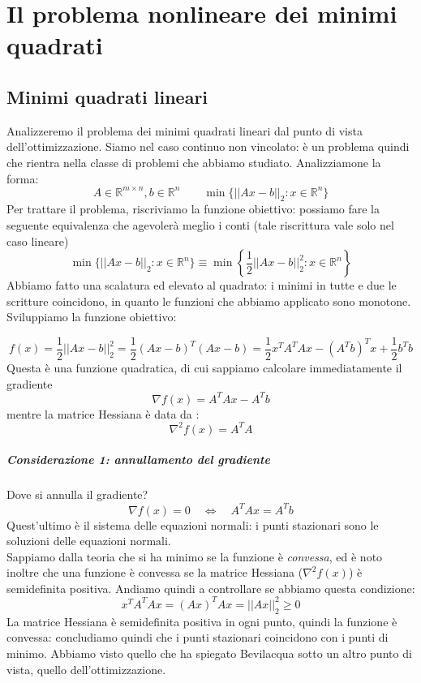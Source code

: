 


\inbpdocument 

\chapter{Il problema nonlineare dei minimi quadrati}
\section{Minimi quadrati lineari}
Analizzeremo il problema dei minimi quadrati lineari dal punto di vista
dell'ottimizzazione. Siamo nel caso continuo non vincolato:
è un problema quindi che rientra nella classe di problemi
che abbiamo studiato. Analizziamone la forma:
$$ A \in \mathbb{R}^{m \times n}, b \in \mathbb{R}^{n} \qquad
 \min \{ || Ax -b ||_{2} : x \in \mathbb{R}^{n} \} $$
Per trattare il problema, riscriviamo la funzione obiettivo:
possiamo fare la seguente equivalenza che  agevoler\`a
meglio i conti (tale riscrittura vale solo nel caso lineare)
$$ \min \{ || Ax -b ||_{2} : x \in \mathbb{R}^{n} \} 
 \equiv
 \min \left\{ \frac{1}{2} || Ax -b ||_{2}^{2} : x \in \mathbb{R}^{n} \right\}
 $$
Abbiamo fatto una scalatura ed elevato al quadrato:
i minimi in tutte e due le scritture coincidono, in quanto
le funzioni che abbiamo applicato sono monotone.
Sviluppiamo la funzione obiettivo:

$$ f(x) = \frac{1}{2} || Ax - b ||_{2}^{2} = \frac{1}{2}(Ax-b)^{T}(Ax-b) =
\frac{1}{2}x^{T} A^{T}A x - (A^{T}b)^{T}x + \frac{1}{2} b^{T}b $$
Questa \`e una  funzione quadratica, di cui sappiamo calcolare immediatamente
il gradiente 
$$ \nabla f(x) = A^{T}A x - A^{T}b $$
mentre la matrice Hessiana \`e data da :
$$ \nabla^{2}f(x) = A^{T}A$$

\paragraph{Considerazione 1: annullamento del gradiente}
Dove si annulla il gradiente?
$$ \nabla f(x) = 0 \quad
 \Longleftrightarrow \quad 
A^{T}A x = A^{T}b $$
Quest'ultimo è il sistema delle equazioni normali: i punti stazionari
sono le soluzioni delle equazioni normali. \\
Sappiamo dalla teoria che si ha minimo se la funzione è \emph{convessa},
ed \`e noto inoltre che una funzione \`e convessa se la matrice Hessiana
($\nabla^{2}f(x)$) \`e semidefinita positiva.
Andiamo quindi a controllare se abbiamo questa condizione:
$$ x^{T} A^{T}A x = (Ax)^{T}Ax = || Ax||_{2}^{2} \geq 0$$
La matrice Hessiana \`e semidefinita positiva in ogni punto, quindi
la funzione è convessa: concludiamo quindi che i punti stazionari
coincidono con i punti di minimo. Abbiamo visto quello che ha spiegato
Bevilacqua sotto un altro punto di vista, quello dell'ottimizzazione.

